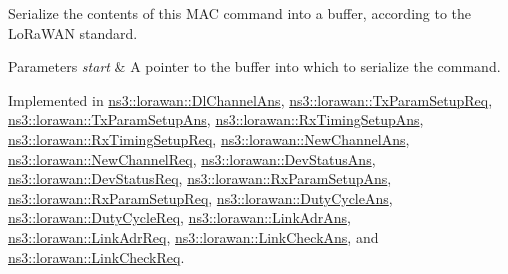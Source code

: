 Serialize the contents of this M\+AC command into a buffer, according to the Lo\+Ra\+W\+AN standard.


\begin{DoxyParams}{Parameters}
{\em start} & A pointer to the buffer into which to serialize the command. \\
\hline
\end{DoxyParams}


Implemented in \hyperlink{classns3_1_1lorawan_1_1DlChannelAns_a9fef6b765888e26a0031757b435028a0}{ns3\+::lorawan\+::\+Dl\+Channel\+Ans}, \hyperlink{classns3_1_1lorawan_1_1TxParamSetupReq_a03dd6a1a48962c67b25e17d9799763f4}{ns3\+::lorawan\+::\+Tx\+Param\+Setup\+Req}, \hyperlink{classns3_1_1lorawan_1_1TxParamSetupAns_a274b762e74e9a5b39d0fc50819d81b3f}{ns3\+::lorawan\+::\+Tx\+Param\+Setup\+Ans}, \hyperlink{classns3_1_1lorawan_1_1RxTimingSetupAns_a582c4325ac60d1708a20717cbd713d1f}{ns3\+::lorawan\+::\+Rx\+Timing\+Setup\+Ans}, \hyperlink{classns3_1_1lorawan_1_1RxTimingSetupReq_a9c19bbf820d8e943a8426d127f4fa3f6}{ns3\+::lorawan\+::\+Rx\+Timing\+Setup\+Req}, \hyperlink{classns3_1_1lorawan_1_1NewChannelAns_a399acb39006cf6d23e19b359385c48b0}{ns3\+::lorawan\+::\+New\+Channel\+Ans}, \hyperlink{classns3_1_1lorawan_1_1NewChannelReq_aa61501c0d31796aea70b93b011b3a0ee}{ns3\+::lorawan\+::\+New\+Channel\+Req}, \hyperlink{classns3_1_1lorawan_1_1DevStatusAns_ab1e376c78c06b679eeb6d73d32aaa62f}{ns3\+::lorawan\+::\+Dev\+Status\+Ans}, \hyperlink{classns3_1_1lorawan_1_1DevStatusReq_a98693e79ac85f1bf19980cc189ba27f6}{ns3\+::lorawan\+::\+Dev\+Status\+Req}, \hyperlink{classns3_1_1lorawan_1_1RxParamSetupAns_af6250c20e44bc56a75d6b5cd9fdcbf0d}{ns3\+::lorawan\+::\+Rx\+Param\+Setup\+Ans}, \hyperlink{classns3_1_1lorawan_1_1RxParamSetupReq_a61e2907f1dc9f06dd1e9cbd45a5583a1}{ns3\+::lorawan\+::\+Rx\+Param\+Setup\+Req}, \hyperlink{classns3_1_1lorawan_1_1DutyCycleAns_aff6f7b100eba491c770be23c342e5f87}{ns3\+::lorawan\+::\+Duty\+Cycle\+Ans}, \hyperlink{classns3_1_1lorawan_1_1DutyCycleReq_ae8bd08eaf66d3a83f4c972d6317bc7dd}{ns3\+::lorawan\+::\+Duty\+Cycle\+Req}, \hyperlink{classns3_1_1lorawan_1_1LinkAdrAns_a057b6fc123d090cdd835c90760a883ca}{ns3\+::lorawan\+::\+Link\+Adr\+Ans}, \hyperlink{classns3_1_1lorawan_1_1LinkAdrReq_a92d99d7a9893de77be8bd14ef0109c53}{ns3\+::lorawan\+::\+Link\+Adr\+Req}, \hyperlink{classns3_1_1lorawan_1_1LinkCheckAns_a54d7dcbbf322ece82652a5ac3603f83c}{ns3\+::lorawan\+::\+Link\+Check\+Ans}, and \hyperlink{classns3_1_1lorawan_1_1LinkCheckReq_a1be81dab18f22e357719385bb1f9fc46}{ns3\+::lorawan\+::\+Link\+Check\+Req}.



